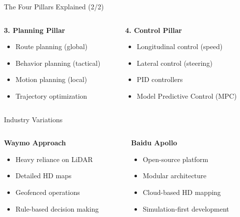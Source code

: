 \documentclass[aspectratio=169]{beamer}
\begin{document}
\begin{frame}{The Four Pillars Explained (2/2)}
    \begin{columns}
        \begin{column}{0.5\textwidth}
            \textbf{3. Planning Pillar}
            \begin{itemize}
                \item Route planning (global)
                \item Behavior planning (tactical)
                \item Motion planning (local)
                \item Trajectory optimization
            \end{itemize}
        \end{column}
        \begin{column}{0.5\textwidth}
            \textbf{4. Control Pillar}
            \begin{itemize}
                \item Longitudinal control (speed)
                \item Lateral control (steering)
                \item PID controllers
                \item Model Predictive Control (MPC)
            \end{itemize}
        \end{column}
    \end{columns}
\end{frame}

\begin{frame}{Industry Variations}
    \begin{columns}
        \begin{column}{0.5\textwidth}
            \textbf{Waymo Approach}
            \begin{itemize}
                \item Heavy reliance on LiDAR
                \item Detailed HD maps
                \item Geofenced operations
                \item Rule-based decision making
            \end{itemize}
        \end{column}
        \begin{column}{0.5\textwidth}
            \textbf{Baidu Apollo}
            \begin{itemize}
                \item Open-source platform
                \item Modular architecture
                \item Cloud-based HD mapping
                \item Simulation-first development
            \end{itemize}
        \end{column}
    \end{columns}
\end{frame}
\end{document}
